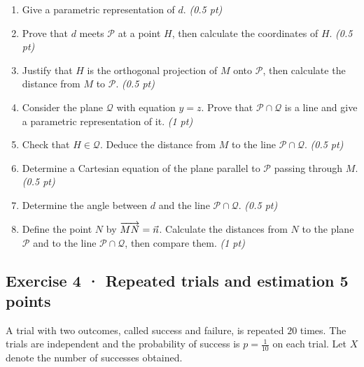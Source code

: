 \begin{enumerate}

\item Give a parametric representation of $d$. \hfill\textit{(0.5 pt)}

\item Prove that $d$ meets $\mathcal P$ at a point $H$, then calculate the coordinates of $H$. \hfill\textit{(0.5 pt)}

\item Justify that $H$ is the orthogonal projection of $M$ onto $\mathcal P$, then calculate the distance from $M$ to $\mathcal P$. \hfill\textit{(0.5 pt)}

\item Consider the plane $\mathcal Q$ with equation $y=z$. Prove that $\mathcal P\cap\mathcal Q$ is a line and give a parametric representation of it. \hfill\textit{(1 pt)}

\item Check that $H\in\mathcal Q$. Deduce the distance from $M$ to the line $\mathcal P\cap\mathcal Q$. \hfill\textit{(0.5 pt)}

\item Determine a Cartesian equation of the plane parallel to $\mathcal P$ passing through $M$. \hfill\textit{(0.5 pt)}

\item Determine the angle between $d$ and the line $\mathcal P\cap\mathcal Q$. \hfill\textit{(0.5 pt)}

\item Define the point $N$ by $\overrightarrow{MN}=\vec n$. Calculate the distances from $N$ to the plane $\mathcal P$ and to the line $\mathcal P\cap\mathcal Q$, then compare them. \hfill\textit{(1 pt)}

\end{enumerate}

\subsection*{Exercise 4 · Repeated trials and estimation \hfill 5 points}A trial with two outcomes, called success and failure, is repeated $20$ times. The trials are independent and the probability of success is $p=\frac{1}{10}$ on each trial. Let $X$ denote the number of successes obtained.

